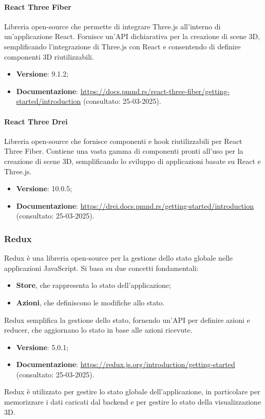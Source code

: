 \paragraph{React Three Fiber}
Libreria open-source che permette di integrare Three.js all'interno di
un'applicazione React. Fornisce un'API dichiarativa per la creazione di scene
3D, semplificando l'integrazione di Three.js con React e consentendo di
definire componenti 3D riutilizzabili.
\begin{itemize}
    \item \textbf{Versione}: 9.1.2;
    \item \textbf{Documentazione}: \url{https://docs.pmnd.rs/react-three-fiber/getting-started/introduction} (consultato:
          25-03-2025).
\end{itemize}

\paragraph{React Three Drei}
Libreria open-source che fornisce componenti e hook riutilizzabili per React
Three Fiber. Contiene una vasta gamma di componenti pronti all'uso per la
creazione di scene 3D, semplificando lo sviluppo di applicazioni basate su
React e Three.js.
\begin{itemize}
    \item \textbf{Versione}: 10.0.5;
    \item \textbf{Documentazione}: \url{https://drei.docs.pmnd.rs/getting-started/introduction} (consultato:
          25-03-2025).
\end{itemize}

\subsubsection{Redux}
Redux è una libreria open-source per la gestione dello stato globale nelle
applicazioni JavaScript. Si basa su due concetti fondamentali:
\begin{itemize}
    \item \textbf{Store}, che rappresenta lo stato dell'applicazione;
    \item \textbf{Azioni}, che definiscono le modifiche allo stato.
\end{itemize}
Redux semplifica la gestione dello stato, fornendo un'API per definire
azioni e reducer, che aggiornano lo stato in base alle azioni ricevute.
\begin{itemize}
    \item \textbf{Versione}: 5.0.1;
    \item \textbf{Documentazione}: \url{https://redux.js.org/introduction/getting-started} (consultato:
          25-03-2025).
\end{itemize}
Redux è utilizzato per gestire lo stato globale dell'applicazione, in particolare per
memorizzare i dati caricati dal backend e per gestire lo stato della
visualizzazione 3D.

